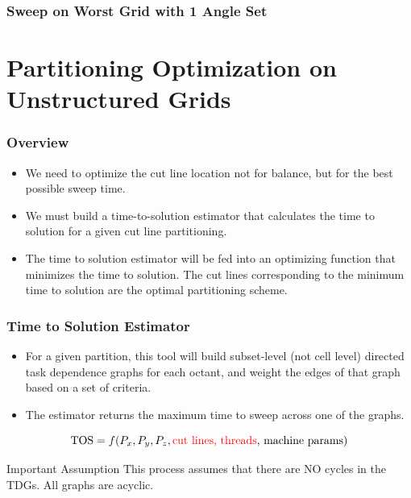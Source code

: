 \documentclass[xcolor={usenames,dvipsnames,svgnames,table}]{beamer}
\begin{document}
\begin{frame}[t]\frametitle{Sweep on Worst Grid with 1 Angle Set}
\end{frame}

\section{Partitioning Optimization on Unstructured Grids}

\begin{frame}[t]\frametitle{Overview}
\begin{block}{}
\begin{itemize}
	\item We need to optimize the cut line location not for balance, but for the best possible sweep time.
	\item We must build a time-to-solution estimator that calculates the time to solution for a given cut line partitioning.
	\item The time to solution estimator will be fed into an optimizing function that minimizes the time to solution. The cut lines corresponding to the minimum time to solution are the optimal partitioning scheme.
\end{itemize}
\end{block}
\end{frame}

\begin{frame}[t]\frametitle{Time to Solution Estimator}
\begin{block}{}
\begin{itemize}
  \item For a given partition, this tool will build subset-level (not cell level) directed task dependence graphs for each octant, and weight the edges of that graph based on a set of criteria.
  \item The estimator returns the maximum time to sweep across one of the graphs.
\end{itemize}
\end{block}
\begin{block}{}
\begin{equation}
\text{TOS} = f(P_x, P_y, P_z, \text{\textcolor{red}{cut lines, threads}, machine params})
\end{equation}
\end{block}
\begin{block}{Important Assumption}
This process assumes that there are NO cycles in the TDGs. All graphs are acyclic.
\end{block}
\end{frame}
\end{document}
